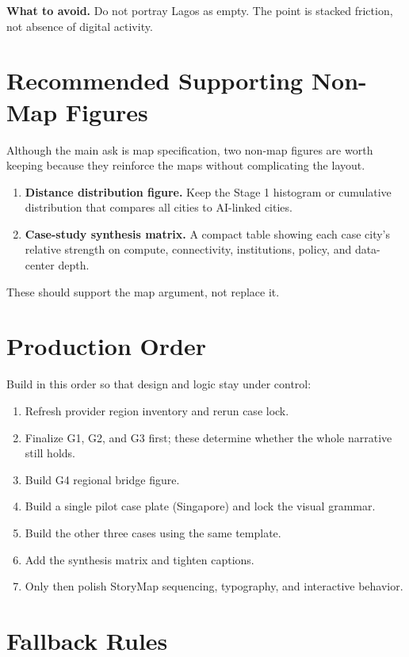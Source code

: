 \documentclass[11pt]{article}
\begin{document}
\textbf{What to avoid.} Do not portray Lagos as empty. The point is stacked friction, not absence of digital activity.

\section{Recommended Supporting Non-Map Figures}

Although the main ask is map specification, two non-map figures are worth keeping because they reinforce the maps without complicating the layout.

\begin{enumerate}[leftmargin=1.4em,itemsep=0.3em]
    \item \textbf{Distance distribution figure.} Keep the Stage 1 histogram or cumulative distribution that compares all cities to AI-linked cities.
    \item \textbf{Case-study synthesis matrix.} A compact table showing each case city's relative strength on compute, connectivity, institutions, policy, and data-center depth.
\end{enumerate}

\noindent These should support the map argument, not replace it.

\section{Production Order}

Build in this order so that design and logic stay under control:
\begin{enumerate}[leftmargin=1.4em,itemsep=0.28em]
    \item Refresh provider region inventory and rerun case lock.
    \item Finalize G1, G2, and G3 first; these determine whether the whole narrative still holds.
    \item Build G4 regional bridge figure.
    \item Build a single pilot case plate (Singapore) and lock the visual grammar.
    \item Build the other three cases using the same template.
    \item Add the synthesis matrix and tighten captions.
    \item Only then polish StoryMap sequencing, typography, and interactive behavior.
\end{enumerate}

\section{Fallback Rules}
\end{document}

